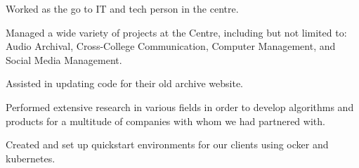 \documentclass[letterpaper]{deedy-resume} %
\begin{document}
\begin{minipage}[t]{0.66\textwidth}
        \sectionspace %




        \begin{tightitemize}
            \item Worked as the go to IT and tech person in the centre.
            \item Managed a wide variety of projects at the Centre, including but not limited to: Audio Archival, Cross-College Communication, Computer Management, and Social Media Management.
            \item Assisted in updating code for their old archive website.
        \end{tightitemize}

        \sectionspace %



        \begin{tightitemize}
            \item Performed extensive research in various fields in order to develop algorithms and products for a multitude of companies with whom we had partnered with.
            \item Created and set up quickstart environments for our clients using ocker and kubernetes.
        \end{tightitemize}

        \sectionspace %
        


\end{minipage} %
\end{document}
